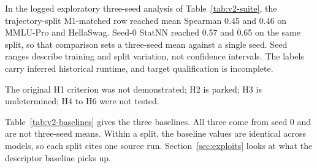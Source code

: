In the logged exploratory three-seed analysis of Table~\ref{tab:v2-suite}, the trajectory-split M1-matched row reached mean Spearman 0.45 and 0.46 on MMLU-Pro and HellaSwag. Seed-0 StatNN reached 0.57 and 0.65 on the same split, so that comparison sets a three-seed mean against a single seed. Seed ranges describe training and split variation, not confidence intervals. The labels carry inferred historical runtime, and target qualification is incomplete.

The original H1 criterion was not demonstrated; H2 is parked; H3 is undetermined; H4 to H6 were not tested.

Table~\ref{tab:v2-baselines} gives the three baselines. All three come from seed 0 and are not three-seed means. Within a split, the baseline values are identical across models, so each split cites one source run. Section~\ref{sec:exploits} looks at what the descriptor baseline picks up.

